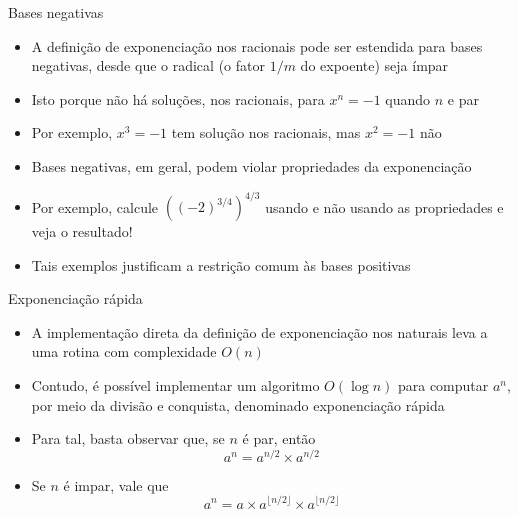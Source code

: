 \begin{frame}[fragile]{Bases negativas}

    \begin{itemize}
        \item A definição de exponenciação nos racionais pode ser estendida para bases negativas, desde que o radical (o fator $1/m$ do expoente) seja ímpar

        \item Isto porque não há soluções, nos racionais, para $x^n = -1$ quando $n$ e par

        \item Por exemplo, $x^3 = -1$ tem solução nos racionais, mas $x^2 = -1$ não

        \item Bases negativas, em geral, podem violar propriedades da exponenciação 

        \item Por exemplo, calcule $((-2)^{3/4})^{4/3}$ usando e não usando as propriedades e veja o resultado!

        \item Tais exemplos justificam a restrição comum às bases positivas
    \end{itemize}

\end{frame}

\begin{frame}[fragile]{Exponenciação rápida}

    \begin{itemize}
        \item A implementação direta da definição de exponenciação nos naturais leva a uma rotina com complexidade $O(n)$

        \item Contudo, é possível implementar um algoritmo $O(\log n)$ para computar $a^n$, por meio da divisão e conquista, denominado exponenciação rápida

        \item Para tal, basta observar que, se $n$ é par, então
$$
    a^n = a^{n/2}\times a^{n/2}
$$

        \item Se $n$ é impar, vale que
$$
    a^n = a\times a^{\lfloor n/2\rfloor}\times a^{\lfloor n/2\rfloor}
$$

    \end{itemize}

\end{frame}

